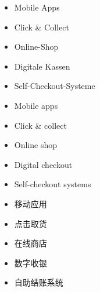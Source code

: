 \begin{otherlanguage}{ngerman}
\begin{itemize}
    \item Mobile Apps
    \item Click \& Collect
    \item Online-Shop
    \item Digitale Kassen
    \item Self-Checkout-Systeme
\end{itemize}
\end{otherlanguage}

\begin{itemize}
    \item Mobile apps
    \item Click \& collect
    \item Online shop
    \item Digital checkout
    \item Self-checkout systems
\end{itemize}

\begin{itemize}
    \item 移动应用
    \item 点击取货
    \item 在线商店
    \item 数字收银
    \item 自助结账系统
\end{itemize}
